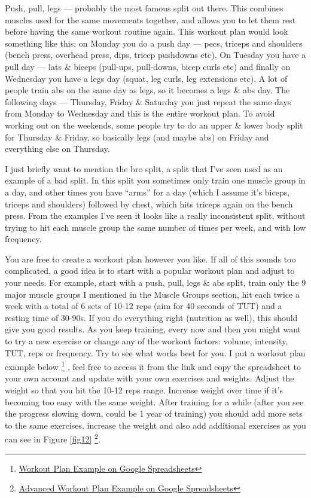 \documentclass[openany, 12pt]{book}
\begin{document}
        Push, pull, legs --- probably the most famous split out there. This combines muscles used for the same movements together, and allows you to let them rest before having the same
        workout routine again. This workout plan would look something like this: on Monday you do a push day --- pecs, triceps and shoulders (bench press, overhead press, dips, tricep pushdowns etc).
        On Tuesday you have a pull day --- lats \& biceps (pull-ups, pull-downs, bicep curls etc) and finally on Wednesday you have a legs day (squat, leg curls, leg extensions etc). A lot of people
        train abs on the same day as legs, so it becomes a legs \& abs day. The following days --- Thursday, Friday \& Saturday you just repeat the same days from Monday to Wednesday and this is the
        entire workout plan. To avoid working out on the weekends, some people try to do an upper \& lower body split for Thursday \& Friday, so basically legs (and maybe abs) on Friday and everything
        else on Thursday. 

        I just briefly want to mention the bro split, a split that I've seen used as an example of a bad split. In this split you sometimes only train one muscle group in a day, and other times you
        have ``arms'' for a day (which I assume it's biceps, triceps and shoulders) followed by chest, which hits triceps again on the bench press. From the examples I've seen it looks like a really
        inconsistent split, without trying to hit each muscle group the same number of times per week, and with low frequency.
        
        You are free to create a workout plan however you like. If all of this sounds too complicated, a good idea is to start with a popular workout plan and adjust to your needs. For example, start
        with a push, pull, legs \& abs split, train only the 9 major muscle groups I mentioned in the Muscle Groups section, hit each twice a week with a total of 6 sets of 10-12 reps
        (aim for 40 seconds of TUT) and a resting time of 30-90s. If you do
        everything right (nutrition as well), this should give you good results. As you keep training, every now and then you might want to try a new exercise or change any of the workout factors:
        volume, intensity, TUT, reps or frequency. Try to see what works best for you.
        I put a workout plan example below
        \footnote{\href{https://docs.google.com/spreadsheets/d/10_J9RkAH8QSpqSg65c3OfkovorFkVoU3Bl213Y9xWUo/edit}{Workout Plan Example on Google Spreadsheets}}
        , feel
        free to access it from the link and copy the spreadsheet to your own account and update with your own exercises and weights. Adjust the weight so that you hit the 10-12 reps range.
        Increase weight over time if it's becoming too easy with the same weight. After training for a while (after you see the progress slowing down, could be 1 year of training)
        you should add more sets to the same exercises, increase the weight and also add additional exercises as you can see in Figure \ref{fig12}
        \footnote{\href{https://docs.google.com/spreadsheets/d/1A1-G2KrdD_O9NgyKty6OGyuEq619M2QIW6Ple3kbSSI/edit}{Advanced Workout Plan Example on Google Spreadsheets}}.
\end{document}
